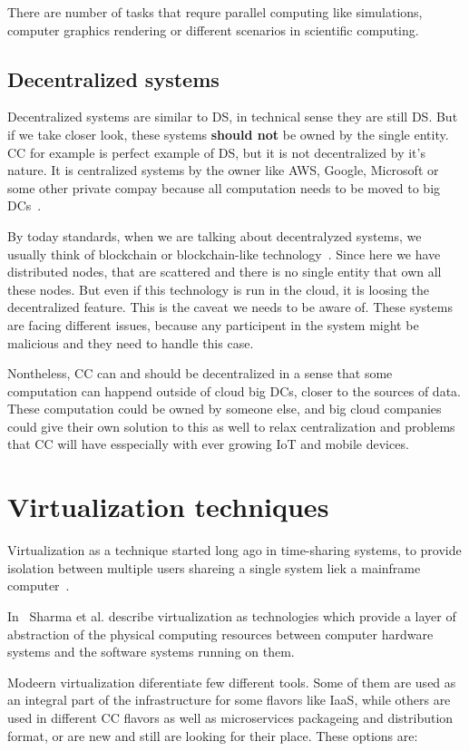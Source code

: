 There are number of tasks that requre parallel computing like simulations, computer graphics rendering or different scenarios in scientific computing.
%
%
\subsection{Decentralized systems}\label{sec:decentralized_systems}
%
Decentralized systems are similar to DS, in technical sense they are still DS. But if we take closer look, these systems \textbf{should not} be owned by the single entity. CC for example is perfect example of DS, but it is not decentralized by it's nature. It is centralized systems by the owner like AWS, Google, Microsoft or some other private compay because all computation needs to be moved to big DCs~\cite{HossainRH18}.

By today standards, when we are talking about decentralyzed systems, we usually think of blockchain or blockchain-like technology~\cite{LeibleSSG19}. Since here we have distributed nodes, that are scattered and there is no single entity that own all these nodes. But even if this technology is run in the cloud, it is loosing the decentralized feature. This is the caveat we needs to be aware of. These systems are facing different issues, because any participent in the system might be malicious and they need to handle this case. 

Nontheless, CC can and should be decentralized in a sense that some computation can happend outside of cloud big DCs, closer to the sources of data. These computation could be owned by someone else, and big cloud companies could give their own solution to this as well to relax centralization and problems that CC will have esspecially with ever growing IoT and mobile devices.
%
%
\section{Virtualization techniques}\label{sec:virtualization_techniques}
%
Virtualization as a technique started long ago in time-sharing systems, to provide isolation between multiple users shareing a single system liek a mainframe computer~\cite{CrosbyB06}. 

In~\cite{Sharma} Sharma et al. describe virtualization as technologies which provide a layer of abstraction of the physical computing resources between computer hardware systems and the software systems running on them.

Modeern virtualization diferentiate few different tools. Some of them are used as an integral part of the infrastructure for some flavors like IaaS, while others are used in different CC flavors as well as microservices packageing and distribution format, or are new and still are looking for their place. These options are:


